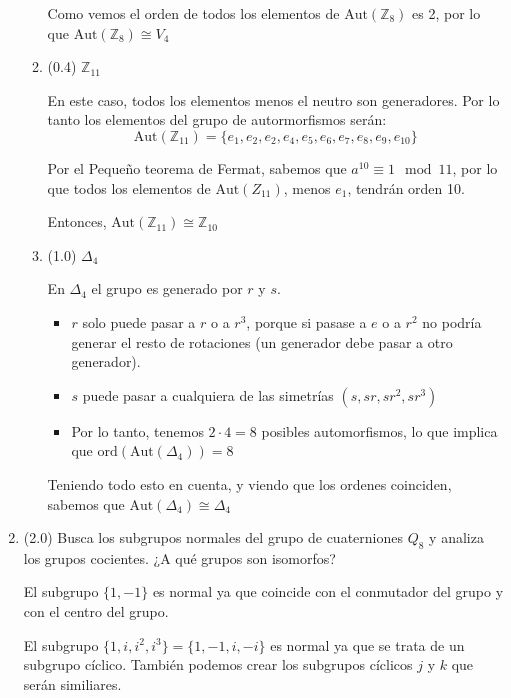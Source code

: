 \documentclass[a4paper,12pt]{article}
\begin{document}
\begin{enumerate}
\begin{enumerate}
        Como vemos el orden de todos los elementos de $\text{Aut}(\mathbb{Z}_8)$ es 2, por lo que $\text{Aut}(\mathbb{Z}_8) \cong V_{4}$


        \item (0.4) $\mathbb{Z}_{11}$

        En este caso, todos los elementos menos el neutro son generadores. Por lo tanto los elementos del grupo de autormorfismos serán:
        $$\text{Aut}(\mathbb{Z}_{11})=\{e_{1},e_{2},e_{2},e_{4},e_{5},e_{6},e_{7},e_{8},e_{9},e_{10}\}$$

        Por el Pequeño teorema de Fermat, sabemos que $a^{10} \equiv 1 \mod 11$, por lo que todos los elementos de $\text{Aut}(Z_{11})$, menos $e_1$, tendrán orden 10.

        Entonces, $\text{Aut}(\mathbb{Z}_{11}) \cong \mathbb{Z}_{10}$

        \item (1.0) $\Delta_{4}$

        En $\Delta_{4}$ el grupo es generado por $r$ y $s$.

        \begin{itemize}
            \item $r$ solo puede pasar a $r$ o a $r^3$, porque si pasase a $e$ o a $r^2$ no podría generar el resto de rotaciones (un generador debe pasar a otro generador).

            \item $s$ puede pasar a cualquiera de las simetrías $(s, sr, sr^2, sr^3)$
            \item Por lo tanto, tenemos $2 \cdot 4 = 8$ posibles automorfismos, lo que implica que $\text{ord}(\text{Aut}(\Delta_{4}))=8$
        \end{itemize}


        Teniendo todo esto en cuenta, y viendo que los ordenes coinciden, sabemos que $\text{Aut}(\Delta_{4}) \cong \Delta_{4}$
    \end{enumerate}

    \pagebreak

\item (2.0) Busca los subgrupos normales del grupo de cuaterniones $Q_8$ y analiza los grupos cocientes. ¿A qué grupos son isomorfos?

    El subgrupo $\{1,-1\}$ es normal ya que coincide con el conmutador del grupo y con el centro del grupo.

    El subgrupo $\{1, i, i^2, i^3 \} = \{1, -1, i, -i\}$ es normal ya que se trata de un subgrupo cíclico. También podemos crear los subgrupos cíclicos $j$ y $k$ que serán similiares.


\end{enumerate}
\end{document}
